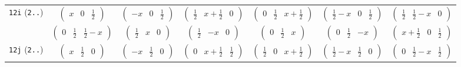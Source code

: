 \documentclass[fleqn,9pt,landscape]{jsarticle}
\begin{document}
\begin{center}
\begin{longtable}{ccccccc}
{\tt 12i} ({\tt 2..}) & $ \begin{pmatrix} x & 0 & \frac{1}{2} \end{pmatrix} $ & $ \begin{pmatrix} - x & 0 & \frac{1}{2} \end{pmatrix} $ & $ \begin{pmatrix} \frac{1}{2} & x + \frac{1}{2} & 0 \end{pmatrix} $ & $ \begin{pmatrix} 0 & \frac{1}{2} & x + \frac{1}{2} \end{pmatrix} $ & $ \begin{pmatrix} \frac{1}{2} - x & 0 & \frac{1}{2} \end{pmatrix} $ & $ \begin{pmatrix} \frac{1}{2} & \frac{1}{2} - x & 0 \end{pmatrix} $ \\
& $ \begin{pmatrix} 0 & \frac{1}{2} & \frac{1}{2} - x \end{pmatrix} $ & $ \begin{pmatrix} \frac{1}{2} & x & 0 \end{pmatrix} $ & $ \begin{pmatrix} \frac{1}{2} & - x & 0 \end{pmatrix} $ & $ \begin{pmatrix} 0 & \frac{1}{2} & x \end{pmatrix} $ & $ \begin{pmatrix} 0 & \frac{1}{2} & - x \end{pmatrix} $ & $ \begin{pmatrix} x + \frac{1}{2} & 0 & \frac{1}{2} \end{pmatrix} $ \\ \hline
{\tt 12j} ({\tt 2..}) & $ \begin{pmatrix} x & \frac{1}{2} & 0 \end{pmatrix} $ & $ \begin{pmatrix} - x & \frac{1}{2} & 0 \end{pmatrix} $ & $ \begin{pmatrix} 0 & x + \frac{1}{2} & \frac{1}{2} \end{pmatrix} $ & $ \begin{pmatrix} \frac{1}{2} & 0 & x + \frac{1}{2} \end{pmatrix} $ & $ \begin{pmatrix} \frac{1}{2} - x & \frac{1}{2} & 0 \end{pmatrix} $ & $ \begin{pmatrix} 0 & \frac{1}{2} - x & \frac{1}{2} \end{pmatrix} $ \\

\end{longtable}
\end{center}
\end{document}
